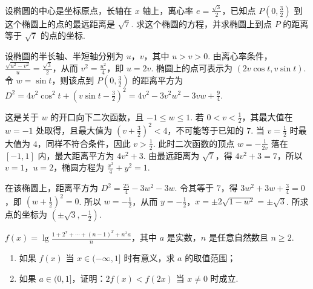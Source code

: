 \documentclass[UTF8,a4paper,oneside,11pt]{ctexbook}
\begin{document}
\begin{problem}
设椭圆的中心是坐标原点，长轴在 \(x\) 轴上，离心率 \(e=\frac{\sqrt{3}}{2}\)，已知点 \(P\left( 0,\frac{3}{2} \right)\) 到这个椭圆上的点的最远距离是 \(\sqrt{7}\). 求这个椭圆的方程，并求椭圆上到点 \(P\) 的距离等于 \(\sqrt{7}\) 的点的坐标.
\end{problem}

\begin{solution}
设椭圆的半长轴、半短轴分别为 \(u\)，\(v\)，其中 \(u>v>0\). 由离心率条件，\(\frac{\sqrt{u^2-v^2}}{u}=\frac{\sqrt{3}}{2}\)，从而 \(v^2=\frac{u^2}{4}\)，即 \(u=2v\). 椭圆上的点可表示为 \((2v\cos t,v\sin t)\). 令 \(w=\sin t\)，则该点到 \(P\left(0,\frac{3}{2}\right)\) 的距离平方为 \(D^2=4v^2\cos^2t+\left(v\sin t-\frac{3}{2}\right)^2=4v^2-3v^2w^2-3vw+\frac{9}{4}\).

这是关于 \(w\) 的开口向下二次函数，且 \(-1\leqslant w\leqslant1\). 若 \(0<v<\frac{1}{2}\)，其最大值在 \(w=-1\) 处取得，且最大值为 \(\left(v+\frac{3}{2}\right)^2<4\)，不可能等于已知的 \(7\). 当 \(v=\frac{1}{2}\) 时最大值为 \(4\)，同样不符合条件，因此 \(v>\frac{1}{2}\). 此时二次函数的顶点 \(w=-\frac{1}{2v}\) 落在 \([-1,1]\) 内，最大距离平方为 \(4v^2+3\). 由最远距离为 \(\sqrt{7}\)，得 \(4v^2+3=7\)，所以 \(v=1\)，\(u=2\)，椭圆方程为 \(\frac{x^2}{4}+y^2=1\).

在该椭圆上，距离平方为 \(D^2=\frac{25}{4}-3w^2-3w\). 令其等于 \(7\)，得 \(3w^2+3w+\frac{3}{4}=0\)，即 \(\left(w+\frac{1}{2}\right)^2=0\). 所以 \(w=-\frac{1}{2}\)，从而 \(y=-\frac{1}{2}\)，\(x=\pm2\sqrt{1-w^2}=\pm\sqrt{3}\). 所求点的坐标为 \(\left(\pm\sqrt{3},-\frac{1}{2}\right)\).
\end{solution}

\begin{problem}
\(f(x)=\lg \frac{1+2^x+\cdots+(n-1)^x+n^xa}{n}\)，其中 \(a\) 是实数，\(n\) 是任意自然数且 \(n\geqslant 2\).
\begin{enumerate}
\item 如果 \(f(x)\) 当 \(x\in(-\infty,1]\) 时有意义，求 \(a\) 的取值范围；
\item 如果 \(a\in(0,1]\)，证明：\(2f(x)<f(2x)\) 当 \(x\neq 0\) 时成立.
\end{enumerate}
\end{problem}
\end{document}
